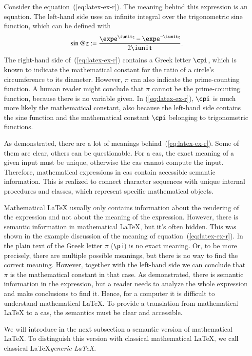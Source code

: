 Consider the equation~(\ref{eq:latex-ex-r}). The meaning behind this expression is an equation. The left-hand side uses an infinite integral over the trigonometric sine function, which can be defined with~\cite[(4.14.1)]{NIST:DLMF}
\begin{equation}
\sin@{z} := \frac{\expe^{\iunit z}-\expe^{-\iunit z}}{2\iunit}.
\end{equation}
The right-hand side of~(\ref{eq:latex-ex-r}) contains a Greek letter $\cpi$, which is known to indicate the mathematical constant for the ratio of a circle's circumference to its diameter. However, $\pi$ can also indicate the prime-counting function. A human reader might conclude that $\pi$ cannot be the prime-counting function, because there is no variable given. In (\ref{eq:latex-ex-r}), $\cpi$ is much more likely the mathematical constant, also because the left-hand side contains the sine function and the mathematical constant $\cpi$ belonging to trigonometric functions.

As demonstrated, there are a lot of meanings behind~(\ref{eq:latex-ex-r}). Some of them are clear, others can be questionable. For a \gls{cas}, the exact meaning of a given input must be unique, otherwise the \gls{cas} cannot compute the input. Therefore, mathematical expressions in \gls{cas} contain accessible semantic information. This is realized to connect character sequences with unique internal procedures and classes, which represent specific mathematical objects.

Mathematical \LaTeX{} usually only contains information about the rendering of the expression and not about the meaning of the expression. However, there is semantic information in mathematical \LaTeX, but it's often hidden. This was shown in the example discussion of the meaning of equation~(\ref{eq:latex-ex-r}). In the plain text of the Greek letter $\pi$ (\verb|\pi|) is no exact meaning. Or, to be more precisely, there are multiple possible meanings, but there is no way to find the correct meaning. However, together with the left-hand side we can conclude that $\pi$ is the mathematical constant in that case. As demonstrated, there is semantic information in the expression, but a reader needs to analyze the whole expression and make conclusions to find it. Hence, for a computer it is difficult to understand mathematical \LaTeX. To provide a translation from mathematical \LaTeX{} to a \gls{cas}, the semantics must be clear and accessible.

We will introduce in the next subsection a semantic version of mathematical \LaTeX. To distinguish this version with classical mathematical \LaTeX, we call classical \LaTeX \textit{generic \LaTeX}.

